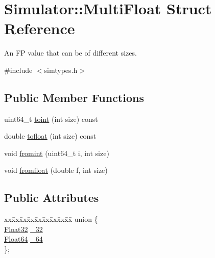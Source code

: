 \hypertarget{struct_simulator_1_1_multi_float}{\section{Simulator\+:\+:Multi\+Float Struct Reference}
\label{struct_simulator_1_1_multi_float}
}


An F\+P value that can be of different sizes.  




{\ttfamily \#include $<$simtypes.\+h$>$}

\subsection*{Public Member Functions}
\begin{DoxyCompactItemize}
\item 
uint64\+\_\+t \hyperlink{struct_simulator_1_1_multi_float_a02831da7b454db6626113d72d395d068}{toint} (int size) const 
\item 
double \hyperlink{struct_simulator_1_1_multi_float_a4f539ad5aa6838ee1577ad8aa268230a}{tofloat} (int size) const 
\item 
void \hyperlink{struct_simulator_1_1_multi_float_a489b9ce30e144586ce4b6a04171398a0}{fromint} (uint64\+\_\+t i, int size)
\item 
void \hyperlink{struct_simulator_1_1_multi_float_af70899bc7cd1d6ce1c43c8da460e2bc8}{fromfloat} (double f, int size)
\end{DoxyCompactItemize}
\subsection*{Public Attributes}
\begin{DoxyCompactItemize}
\item 
\begin{tabbing}
xx\=xx\=xx\=xx\=xx\=xx\=xx\=xx\=xx\=\kill
union \{\\
\>\hyperlink{struct_simulator_1_1_float32}{Float32} \hyperlink{struct_simulator_1_1_multi_float_a41d714ef53cbc30bc29d0343ddeb77a1}{\_32}\\
\>\hyperlink{struct_simulator_1_1_float64}{Float64} \hyperlink{struct_simulator_1_1_multi_float_afcca405584d45b86c6aa1cec1920cebe}{\_64}\\
\}; \\

\end{tabbing}\end{DoxyCompactItemize}


